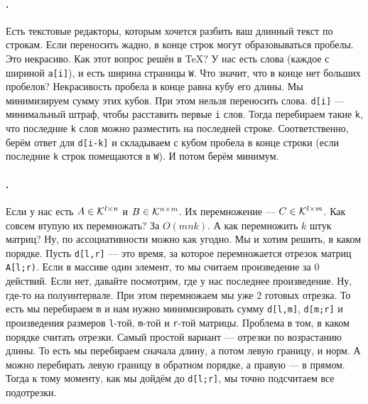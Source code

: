 \documentclass{article}
\newcommand{\pseudo}{PseudoLexer.py:PseudoLexer -x}
\newcommand{\pseudocode}[1]{\texttt{#1}}
\begin{document}
    \paragraph{.}
    Есть текстовые редакторы, которым хочется разбить ваш длинный текст по строкам. Если переносить жадно, в конце строк могут образовываться пробелы. Это некрасиво. Как этот вопрос решён в \TeX? У нас есть слова (каждое с шириной \pseudocode{a[i]}), и есть ширина страницы \pseudocode{W}. Что значит, что в конце нет больших пробелов? Некрасивость пробела в конце равна кубу его длины. Мы минимизируем сумму этих кубов. При этом нельзя переносить слова. \pseudocode{d[i]} --- минимальный штраф, чтобы расставить первые \pseudocode{i} слов. Тогда перебираем такие \pseudocode{k}, что последние \pseudocode{k} слов можно разместить на последней строке. Соответственно, берём ответ для \pseudocode{d[i-k]} и складываем с кубом пробела в конце строки (если последние \pseudocode{k} строк помещаются в \pseudocode{W}). И потом берём минимум.
    \paragraph{.}
    Если у нас есть $A\in{\mathcal{K}}^{l\times n}$ и $B\in{\mathcal{K}}^{n\times m}$. Их перемножение --- $C\in{\mathcal{K}}^{l\times m}$. Как совсем втупую их перемножать? За $O(mnk)$. А как перемножить $k$ штук матриц? Ну, по ассоциативности можно как угодно. Мы и хотим решить, в каком порядке. Пусть \pseudocode{d[l,r]} --- это время, за которое перемножается отрезок матриц \pseudocode{A[l;r)}. Если в массиве один элемент, то мы считаем произведение за 0 действий. Если нет, давайте посмотрим, где у нас последнее произведение. Ну, где-то на полуинтервале. При этом перемножаем мы уже 2 готовых отрезка. То есть мы перебираем \pseudocode{m} и нам нужно минимизировать сумму \pseudocode{d[l,m]}, \pseudocode{d[m;r]} и произведения размеров \pseudocode{l}-той, \pseudocode{m}-той и \pseudocode{r}-той матрицы. Проблема в том, в каком порядке считать отрезки. Самый простой вариант --- отрезки по возрастанию длины. То есть мы перебираем сначала длину, а потом левую границу, и норм. А можно перебирать левую границу в обратном порядке, а правую --- в прямом. Тогда к тому моменту, как мы дойдём до \pseudocode{d[l;r]}, мы точно подсчитаем все подотрезки.
\end{document}
